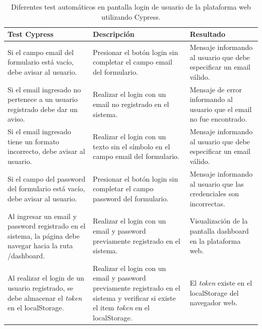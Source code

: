 \begin{table}[h]
	\centering
	\caption[Test de login utilizando Cypress]{Diferentes test automáticos en pantalla login de usuario de la plataforma web utilizando Cypress.}
	\begin{tabular}{p{4cm} p{4cm} p{4cm}}    
		\toprule
		\textbf{Test Cypress }  		& \textbf{Descripción}	& \textbf{Resultado}\\
		\midrule
	
		Si el campo email del formulario está vacío, debe avisar al usuario. 			& Presionar el botón login sin completar el campo email del formulario. 				& Mensaje informando al usuario que debe especificar un email válido. \\	
		
		Si el email ingresado no pertenece a un usuario registrado debe dar un aviso.	 			& Realizar el login con un email no registrado en el sistema. 				& Mensaje de error informando al usuario que el email no fue encontrado.\\	
		
		Si el email ingresado tiene un formato incorrecto, debe avisar al usuario.   & Realizar el login con un texto sin el símbolo \@ en el campo email del formulario.		& Mensaje informando al usuario que debe especificar un email válido.  \\
		
		Si el campo del password del formulario está vacío, debe avisar al usuario. 	 & Presionar el botón login sin completar el campo password del formulario.    & Mensaje informando al usuario que las credenciales son incorrectas.\\	
		
		  
		Al ingresar un email y password registrado en el sistema, la página debe navegar hacia la ruta /dashboard.   & Realizar el login con un email y password previamente registrado en el sistema.  & Visualización de la pantalla dashboard en la plataforma web.\\	
		
		Al realizar el login de un usuario registrado, se debe almacenar el \textit{token} en el localStorage. 		& Realizar el login con un email y password previamente registrado en el sistema y verificar si existe el item \textit{token} en el localStorage. 		& El \textit{token} existe en el localStorage del navegador web.\\	
		
		\bottomrule
		\hline
	\end{tabular}
	\label{tab:test-cypress-login}
\end{table}


